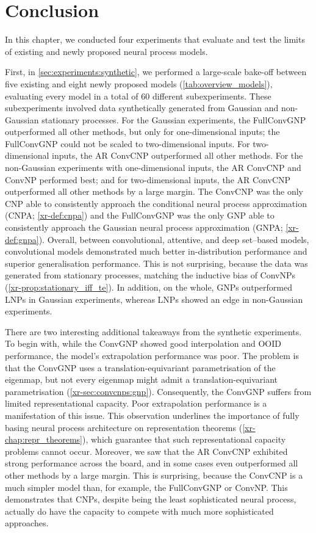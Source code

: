 \documentclass[12pt, twoside]{report}
\newcommand{\xrprefix}[1]{xr-#1}
\begin{document}
\section{Conclusion}
\label{sec:experiments:conclusion}

In this chapter, we conducted four experiments that evaluate and test the limits of existing and newly proposed neural process models.

First, in \cref{sec:experiments:synthetic}, we performed a large-scale bake-off between five existing and eight newly proposed models (\cref{tab:overview_models}), evaluating every model in a total of 60 different subexperiments.
These subexperiments involved data synthetically generated from Gaussian and non-Gaussian stationary processes. 
For the Gaussian experiments, the FullConvGNP outperformed all other methods, but only for one-dimensional inputs;
the FullConvGNP could not be scaled to two-dimensional inputs.
For two-dimensional inputs, the AR ConvCNP outperformed all other methods.
For the non-Gaussian experiments with one-dimensional inputs, the AR ConvCNP and ConvNP performed best;
and for two-dimensional inputs, the AR ConvCNP outperformed all other methods by a large margin.
The ConvCNP was the only CNP able to consistently approach the conditional neural process approximation (CNPA; \cref{\xrprefix{def:cnpa}})
and the FullConvGNP was the only GNP able to consistently approach the Gaussian neural process approximation (GNPA; \cref{\xrprefix{def:gnpa}}).
Overall, between convolutional, attentive, and deep set--based models, convolutional models demonstrated much better in-distribution performance and superior generalisation performance.
This is not surprising, because the data was generated from stationary processes, matching the inductive bias of ConvNPs (\cref{\xrprefix{prop:stationary_iff_te}}).
In addition, on the whole, GNPs outperformed LNPs in Gaussian experiments, whereas LNPs showed an edge in non-Gaussian experiments.

There are two interesting additional takeaways from the synthetic experiments.
To begin with, while the ConvGNP showed good interpolation and OOID performance, the model's extrapolation performance was poor.
The problem is that the ConvGNP uses a translation-equivariant parametrisation of the eigenmap, but not every eigenmap might admit a translation-equivariant parametrisation (\cref{\xrprefix{sec:convcnps:gnp}}).
Consequently, the ConvGNP suffers from limited representational capacity.
Poor extrapolation performance is a manifestation of this issue.
This observation underlines the importance of fully basing neural process architecture on representation theorems (\cref{\xrprefix{chap:repr_theorems}}), which guarantee that such representational capacity problems cannot occur.
Moreover, we saw that the AR ConvCNP exhibited strong performance across the board, and in some cases even outperformed all other methods by a large margin.
This is surprising, because the ConvCNP is a much simpler model than, for example, the FullConvGNP or ConvNP.
This demonstrates that CNPs, despite being the least sophisticated neural process, actually do have the capacity to compete with much more sophisticated approaches.
\end{document}
